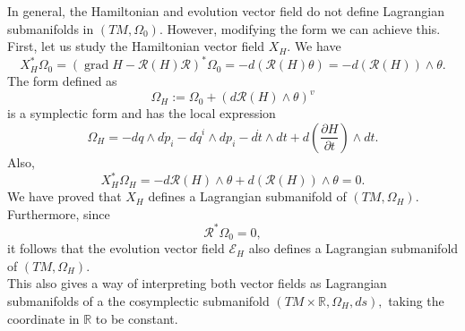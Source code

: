 \documentclass[12pt]{article}
\newtheorem{prop}{Proposition}[section]
\newcommand{\grad}{\operatorname{grad}}
\renewcommand{\d}{\operatorname{d}}
\newcommand{\partder}[2]{\frac{\partial #1}{\partial #2}}
\begin{document}
In general, the Hamiltonian and evolution vector field do not define Lagrangian submanifolds in $(TM,\Omega_0)$. However, modifying the form we can achieve this. First, let us study the Hamiltonian vector field $X_H$. We have $$X_H^* \Omega_0 = (\grad H - \mathcal{R}(H) \mathcal{R}) ^* \Omega_0 = - d(\mathcal{R}(H) \theta) = - d(\mathcal{R}(H)) \wedge \theta.$$
The form defined as 
$$\Omega_H := \Omega_0 + \left( d\mathcal{R}(H) \wedge \theta \right)^v
$$ 
is a symplectic form and has the local expression  
$$
\Omega_H = - dq \wedge d\dot{p}_i - d\dot{q}^i \wedge dp_i - d\dot{t} \wedge dt + d\left( \partder{H}{t} \right) \wedge dt.
$$ 
Also,  $$X_H^* \Omega_H =  - d\mathcal{R}(H) \wedge \theta +  d(\mathcal{R}(H)) \wedge \theta = 0.$$ 
We have proved that $X_H$ defines a Lagrangian submanifold of $(TM, \Omega_H).$ Furthermore, since $$\mathcal{R} ^* \Omega_0 = 0,$$ it follows that the evolution vector field $\mathcal{E}_H$ also defines a Lagrangian submanifold of $(TM , \Omega_H)$. \\

This also gives a way of interpreting both vector fields as Lagrangian submanifolds of a the cosymplectic submanifold $(TM \times \mathbb{R}, \Omega_H, ds),$ taking the coordinate in $\mathbb{R}$ to be constant.

\end{document}
